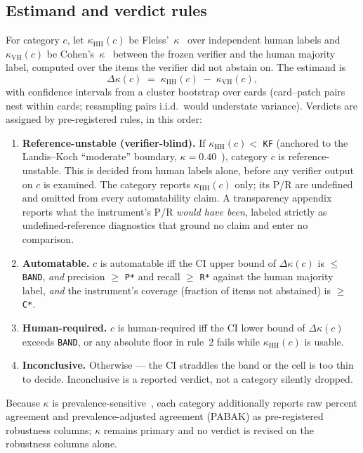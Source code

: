 \documentclass[conference]{IEEEtran}
\newcommand{\ph}[1]{\colorbox{yellow!35}{\texttt{\footnotesize #1}}}
\newcommand{\kh}{\kappa_{\mathrm{HH}}}
\newcommand{\kv}{\kappa_{\mathrm{VH}}}
\newcommand{\dk}{\Delta\kappa}
\begin{document}
\subsection{Estimand and verdict rules}\label{sec:design:verdicts}
For category $c$, let $\kh(c)$ be Fleiss'~$\kappa$~\cite{fleiss1971} over
independent human labels and $\kv(c)$ be Cohen's~$\kappa$~\cite{cohen1960}
between the frozen verifier and the human majority label, computed over the
items the verifier did not abstain on. The estimand is
\begin{equation}
  \dk(c) \;=\; \kh(c) \;-\; \kv(c),
\end{equation}
with confidence intervals from a cluster bootstrap over cards (card--patch
pairs nest within cards; resampling pairs i.i.d.\ would understate variance).
Verdicts are assigned by pre-registered rules, in this order:

\begin{enumerate}[leftmargin=1.5em]
  \item \textbf{Reference-unstable (verifier-blind).} If
  $\kh(c) < $ \ph{KF} (anchored to the Landis--Koch ``moderate''
  boundary, $\kappa=0.40$~\cite{landis1977}), category $c$ is
  reference-unstable. This is decided from human labels alone, before any
  verifier output on $c$ is examined. The category reports $\kh(c)$ only;
  its P/R are undefined and omitted from every automatability claim. A
  transparency appendix reports what the instrument's P/R \emph{would have
  been}, labeled strictly as undefined-reference diagnostics that ground no
  claim and enter no comparison.
  \item \textbf{Automatable.} $c$ is automatable iff the CI upper bound of
  $\dk(c)$ is $\leq$ \ph{BAND}, \emph{and} precision $\geq$ \ph{P*} and recall
  $\geq$ \ph{R*} against the human majority label, \emph{and} the instrument's
  coverage (fraction of items not abstained) is $\geq$ \ph{C*}.
  \item \textbf{Human-required.} $c$ is human-required iff the CI lower bound of
  $\dk(c)$ exceeds \ph{BAND}, or any absolute floor in rule~2 fails while
  $\kh(c)$ is usable.
  \item \textbf{Inconclusive.} Otherwise --- the CI straddles the band or the
  cell is too thin to decide. Inconclusive is a reported verdict, not a
  category silently dropped.
\end{enumerate}

Because $\kappa$ is prevalence-sensitive~\cite{mchugh2012kappa}, each category
additionally reports raw percent agreement and prevalence-adjusted agreement
(PABAK) as pre-registered robustness columns; $\kappa$ remains primary and no
verdict is revised on the robustness columns alone.
\end{document}
